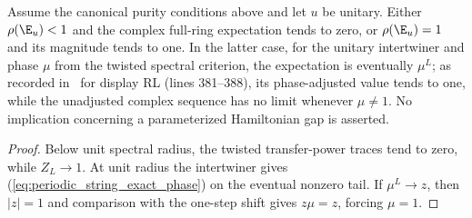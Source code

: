 \begin{lemma}
    \label{thm:periodic_string_spectral_alternatives}
    \leanok
    Assume the canonical purity conditions above and let $u$ be unitary.
    Either $\rho(\E_u)<1$ and the complex full-ring expectation tends to
    zero, or $\rho(\E_u)=1$ and its magnitude tends to one.
    In the latter case, for the unitary intertwiner and phase $\mu$
    from the twisted spectral criterion, the expectation is
    eventually $\mu^L$; as recorded in~\cite{gap:pgwsvc08_string_order_virtual_boundary}
    for display RL (lines 381--388), its phase-adjusted value tends to one,
    while the unadjusted complex sequence has no limit whenever $\mu\ne1$.
    No implication concerning a parameterized Hamiltonian gap is asserted.
\end{lemma}
\begin{proof}
    \leanok
    Below unit spectral radius, the twisted transfer-power traces tend to
    zero, while $Z_L\to1$. At unit radius the intertwiner gives
    (\ref{eq:periodic_string_exact_phase}) on the eventual nonzero tail.
    If $\mu^L\to z$, then $|z|=1$ and comparison with the one-step shift
    gives $z\mu=z$, forcing $\mu=1$.
\end{proof}
